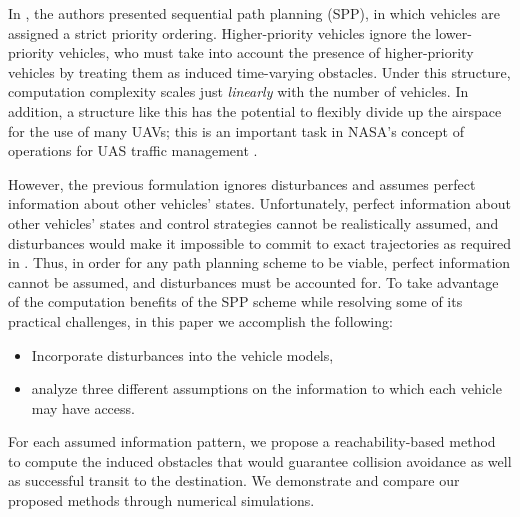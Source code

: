 In \cite{Chen15}, the authors presented sequential path planning (SPP), in which vehicles are assigned a strict priority ordering. Higher-priority vehicles ignore the lower-priority vehicles, who must take into account the presence of higher-priority vehicles by treating them as induced time-varying obstacles. Under this structure, computation complexity scales just \textit{linearly} with the number of vehicles. In addition, a structure like this has the potential to flexibly divide up the airspace for the use of many UAVs; this is an important task in NASA's concept of operations for UAS traffic management \cite{Kopardekar16}. 

However, the previous formulation ignores disturbances and assumes perfect information about other vehicles' states. Unfortunately, perfect information about other vehicles' states and control strategies cannot be realistically assumed, and disturbances would make it impossible to commit to exact trajectories as required in \cite{Chen15}. Thus, in order for any path planning scheme to be viable, perfect information cannot be assumed, and disturbances must be accounted for. To take advantage of the computation benefits of the SPP scheme while resolving some of its practical challenges, in this paper we accomplish the following:

\begin{itemize}
\item Incorporate disturbances into the vehicle models,
\item analyze three different assumptions on the information to which each vehicle may have access.
\end{itemize}

For each assumed information pattern, we propose a reachability-based method to compute the induced obstacles that would guarantee collision avoidance as well as successful transit to the destination. We demonstrate and compare our proposed methods through numerical simulations.